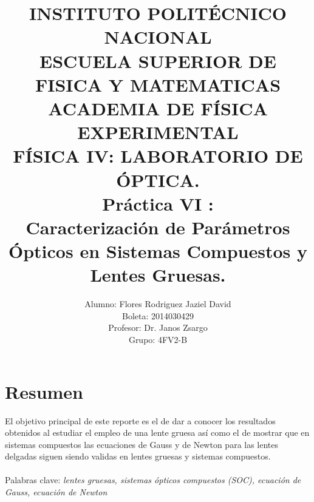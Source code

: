 \documentclass[13,twocolumn,letterpaper]{article}
\title{
    		\usefont{OT1}{bch}{b}{n}
    		\normalfont \normalsize \textsc{INSTITUTO POLITÉCNICO NACIONAL \\ 
    		ESCUELA SUPERIOR DE FISICA Y MATEMATICAS \\
    		ACADEMIA DE FÍSICA EXPERIMENTAL} \\ 
    		FÍSICA IV: LABORATORIO DE ÓPTICA. \\[10pt]
    		\huge Práctica VI :\\
    Caracterización de Parámetros Ópticos en Sistemas Compuestos y Lentes Gruesas.\\
    }
\author[0]{Alumno: Flores Rodriguez Jaziel David \\
    Boleta: 2014030429 \\
    Profesor: Dr. Janos Zsargo\\
    Grupo: 4FV2-B \\
            }
\renewcommand{\figurename}{\textbf{Figura}}
\renewcommand{\tablename}{\textbf{Tabla}}
\renewcommand{\refname}{Bibliografía}
\renewcommand{\abstractname}{\large\textbf{Resumen}}
\renewcommand{\contentsname}{Contenido}
\renewcommand{\partname}{Parte}
\renewcommand{\appendixname}{Apéndice}
\renewcommand{\sin}{sen}
\begin{document}
    
    \maketitle
   
    
    \section*{Resumen}
    El objetivo principal de este reporte es el de dar a conocer los resultados obtenidos al estudiar  el empleo de una lente gruesa as\'i como el de mostrar que en sistemas compuestos las ecuaciones de Gauss y de Newton para las lentes delgadas siguen siendo validas en lentes gruesas y sistemas compuestos.  \\\\
	Palabras clave: \emph{lentes gruesas, sistemas \'opticos compuestos (SOC), ecuación de Gauss, ecuación de Newton}\\



\renewcommand{\figurename}{\textbf{Figura}}
\renewcommand{\tablename}{\textbf{Tabla}}
\renewcommand{\refname}{Bibliografía}
\renewcommand{\abstractname}{\large\textbf{Resumen}}
\renewcommand{\contentsname}{Contenido}
\renewcommand{\partname}{Parte}
\renewcommand{\appendixname}{Apéndice}
\renewcommand{\sin}{sen}	
\newenvironment{Figure}{\par\medskip\noindent\minipage{\linewidth}}{\endminipage\par\medskip}
\end{document}
